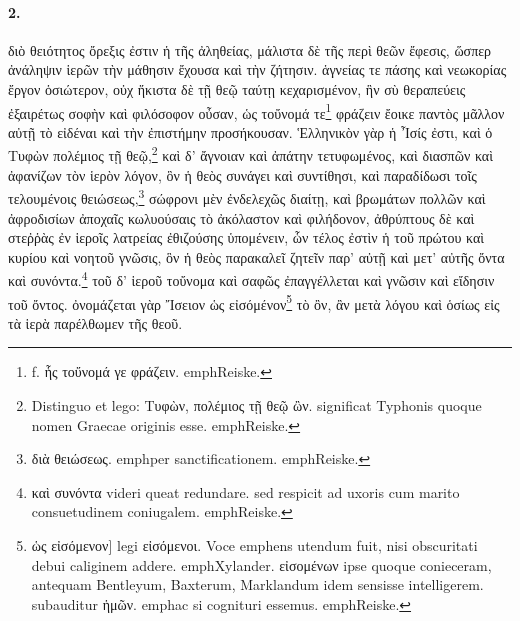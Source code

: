 \documentclass[a4paper, 11pt, oneside, polutonikogreek, german]{article}
\begin{document}
\paragraph{2.}
διὸ θειότητος ὄρεξις ἐστιν ἡ τῆς ἀληθείας, μάλιστα δὲ τῆς περὶ θεῶν ἔφεσις, ὥσπερ ἀνάληψιν ἱερῶν τὴν μάθησιν ἔχουσα καὶ τὴν ζήτησιν. ἁγνείας τε πάσης καὶ νεωκορίας ἔργον ὁσιώτερον, οὐχ ἥκιστα δὲ τῇ θεῷ ταύτῃ κεχαρισμένον, ἣν σὺ θεραπεύεις ἐξαιρέτως σοφὴν καὶ φιλόσοφον οὖσαν, ὡς τοὔνομά τε\footnote{f. ἧς τοὔνομά γε φράζειν. emph{Reiske.}} φράζειν ἔοικε παντὸς μᾶλλον αὐτῇ τὸ εἰδέναι καὶ τὴν ἐπιστήμην προσήκουσαν. Ἑλληνικὸν γὰρ ἡ Ἶσίς ἐστι, καὶ ὁ Τυφὼν πολέμιος τῇ θεῷ,\footnote{Distinguo et lego: Τυφὼν, πολέμιος τῇ θεῷ ὢν. significat Typhonis quoque nomen Graecae originis esse. emph{Reiske.}} καὶ δ' ἄγνοιαν καὶ ἀπάτην τετυφωμένος, καὶ διασπῶν καὶ ἀφανίζων τὸν ἱερὸν λόγον, ὃν ἡ θεὸς συνάγει καὶ συντίθησι, καὶ παραδίδωσι τοῖς τελουμένοις θειώσεως,\footnote{διὰ θειώσεως. emph{per sanctificationem.} emph{Reiske.}} σώφρονι μὲν ἐνδελεχῶς διαίτῃ, καὶ βρωμάτων πολλῶν καὶ ἀφροδισίων ἀποχαῖς κωλυούσαις τὸ ἀκόλαστον καὶ φιλήδονον, ἀθρύπτους δὲ καὶ στεῤῥὰς ἐν ἱεροῖς λατρείας ἐθιζούσης ὑπομένειν, ὧν τέλος ἐστὶν ἡ τοῦ πρώτου καὶ κυρίου καὶ νοητοῦ γνῶσις, ὃν ἡ θεὸς παρακαλεῖ ζητεῖν παρ' αὐτῇ καὶ μετ' αὐτῆς ὄντα καὶ συνόντα.\footnote{καὶ συνόντα videri queat redundare. sed respicit ad uxoris cum marito consuetudinem coniugalem. emph{Reiske.}} τοῦ δ' ἱεροῦ τοὔνομα καὶ σαφῶς ἐπαγγέλλεται καὶ γνῶσιν καὶ εἴδησιν τοῦ ὄντος. ὀνομάζεται γὰρ Ἴσειον ὡς εἰσόμένον\footnote{ὡς εἰσόμενον] legi εἰσόμενοι. Voce emph{ens} utendum fuit, nisi obscuritati debui caliginem addere. emph{Xylander.} εἰσομένων ipse quoque conieceram, antequam Bentleyum, Baxterum, Marklandum idem sensisse intelligerem. subauditur ἡμῶν. emph{ac si cognituri essemus.} emph{Reiske.}} τὸ ὂν, ἂν μετὰ λόγου καὶ ὁσίως εἰς τὰ ἱερὰ παρέλθωμεν τῆς θεοῦ.
\end{document}
